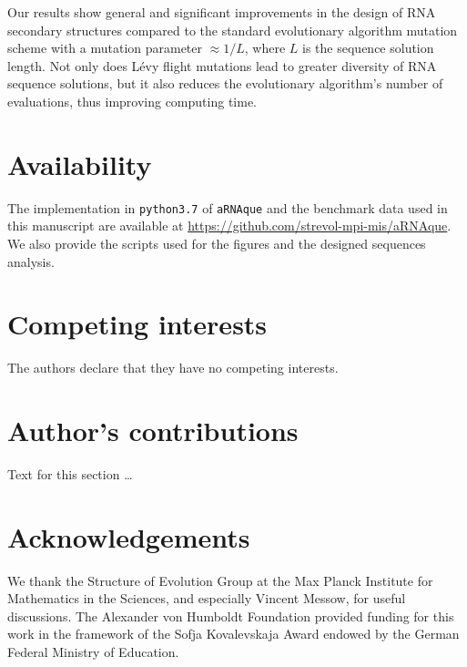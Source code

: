 Our results show general and significant improvements in the design of RNA secondary structures compared to the standard evolutionary algorithm mutation scheme with a mutation parameter $\approx 1/L$, where $L$ is the sequence solution length. Not only does Lévy flight mutations lead to greater diversity of RNA sequence solutions, but it also reduces the evolutionary algorithm’s number of evaluations, thus improving computing time. 

\section*{Availability}
The implementation in \texttt{python3.7} of \texttt{aRNAque} and the benchmark data used in this manuscript are available at \url{https://github.com/strevol-mpi-mis/aRNAque}. We also provide the scripts used for the figures and the designed sequences analysis.
\section*{Competing interests}
The authors declare that they have no competing interests.

\section*{Author's contributions}
Text for this section \ldots

\section*{Acknowledgements}
We thank the Structure of Evolution Group at the Max Planck Institute for Mathematics in the Sciences, and especially Vincent Messow, for useful discussions. The Alexander von Humboldt Foundation provided funding for this work in the framework of the Sofja Kovalevskaja Award endowed by the German Federal Ministry of Education.
